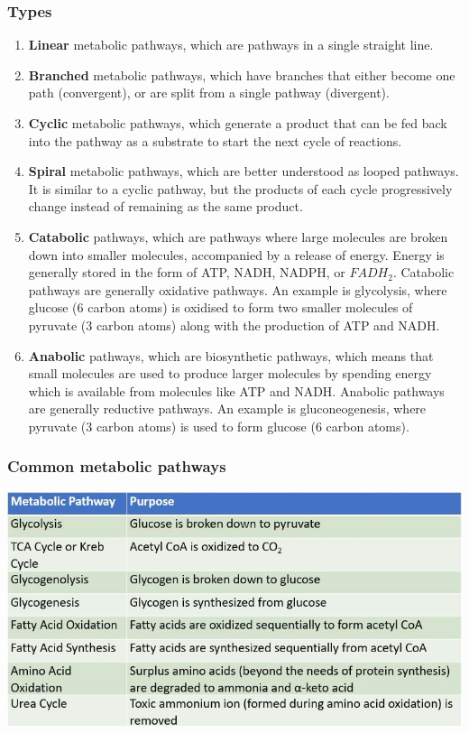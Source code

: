 \documentclass[11pt]{article}
\begin{document}
\subsubsection{Types}
\label{sec:org2cd3b62}
\begin{enumerate}
\item \textbf{Linear} metabolic pathways, which are pathways in a single straight line.
\item \textbf{Branched} metabolic pathways, which have branches that either become one path (convergent), or are split from a single pathway (divergent).
\item \textbf{Cyclic} metabolic pathways, which generate a product that can be fed back into the pathway as a substrate to start the next cycle of reactions.
\item \textbf{Spiral} metabolic pathways, which are better understood as looped pathways. It is similar to a cyclic pathway, but the products of each cycle progressively change instead of remaining as the same product.
\item \textbf{Catabolic} pathways, which are pathways where large molecules are broken down into smaller molecules, accompanied by a release of energy. Energy is generally stored in the form of ATP, NADH, NADPH, or \(FADH_2\). Catabolic pathways are generally oxidative pathways. An example is glycolysis, where glucose (6 carbon atoms) is oxidised to form two smaller molecules of pyruvate (3 carbon atoms) along with the production of ATP and NADH.
\item \textbf{Anabolic} pathways, which are biosynthetic pathways, which means that small molecules are used to produce larger molecules by spending energy which is available from molecules like ATP and NADH. Anabolic pathways are generally reductive pathways. An example is gluconeogenesis, where pyruvate (3 carbon atoms) is used to form glucose (6 carbon atoms).
\end{enumerate}
\subsubsection{Common metabolic pathways}
\label{sec:org0f4ebea}
\begin{center}
\includegraphics[width=.9\linewidth]{./images/metabolic-pathways.jpg}
\end{center}
\end{document}
